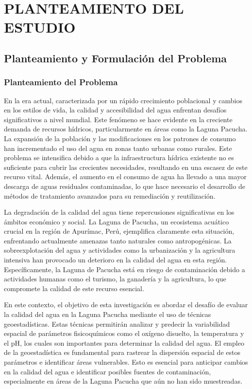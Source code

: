 \chapter{PLANTEAMIENTO DEL ESTUDIO}  

\section{Planteamiento y Formulación del Problema}

\subsection{Planteamiento del Problema}

En la era actual, caracterizada por un rápido crecimiento poblacional y cambios en los estilos de vida, la calidad y accesibilidad del agua enfrentan desafíos significativos a nivel mundial. Este fenómeno se hace evidente en la creciente demanda de recursos hídricos, particularmente en áreas como la Laguna Pacucha. La expansión de la población y las modificaciones en los patrones de consumo han incrementado el uso del agua en zonas tanto urbanas como rurales. Este problema se intensifica debido a que la infraestructura hídrica existente no es suficiente para cubrir las crecientes necesidades, resultando en una escasez de este recurso vital. Además, el aumento en el consumo de agua ha llevado a una mayor descarga de aguas residuales contaminadas, lo que hace necesario el desarrollo de métodos de tratamiento avanzados para su remediación y reutilización.

La degradación de la calidad del agua tiene repercusiones significativas en los ámbitos económico y social. La Laguna de Pacucha, un ecosistema acuático crucial en la región de Apurímac, Perú, ejemplifica claramente esta situación, enfrentando actualmente amenazas tanto naturales como antropogénicas. La sobreexplotación del agua y actividades como la urbanización y la agricultura intensiva han provocado un deterioro en la calidad del agua en esta región. Específicamente, la Laguna de Pacucha está en riesgo de contaminación debido a actividades humanas como el turismo, la ganadería y la agricultura, lo que compromete la calidad de este recurso esencial.

En este contexto, el objetivo de esta investigación es abordar el desafío de evaluar la calidad del agua en la Laguna Pacucha mediante el uso de técnicas geoestadísticas. Estas técnicas permitirán analizar y predecir la variabilidad espacial de parámetros fisicoquímicos como el oxígeno disuelto, la temperatura y el pH, los cuales son importantes para determinar la calidad del agua. El empleo de la geoestadística es fundamental para rastrear la dispersión espacial de estos parámetros e identificar áreas vulnerables. Esto es esencial para anticipar cambios en la calidad del agua e identificar posibles fuentes de contaminación, especialmente en áreas de la Laguna Pacucha que aún no han sido muestreadas.

